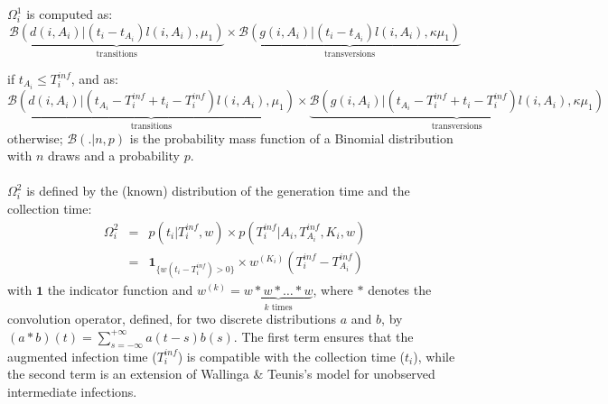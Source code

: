 \documentclass[10pt]{article}
\begin{document}
$\Omega_i^1$ is computed as: 
\begin{equation}
\underbrace{\mathcal{B}\left(d(i,A_i) | (t_i - t_{A_i}) l(i,A_i), \mu_1 \right)}_{\mbox{transitions}}
\times 
\underbrace{\mathcal{B}\left(g(i,A_i) | (t_i - t_{A_i}) l(i,A_i), \kappa \mu_1 \right)}_{\mbox{transversions}}
\end{equation}

if $t_{A_i} \leq T_i^{inf} $, and as:
\begin{equation}
\underbrace{\mathcal{B}\left(d(i,A_i) | (t_{A_i} - T_i^{inf} + t_i - T_i^{inf}) l(i,A_i), \mu_1 \right)}_{\mbox{transitions}}
\times 
\underbrace{\mathcal{B}\left(g(i,A_i) | (t_{A_i} - T_i^{inf} + t_i - T_i^{inf}) l(i,A_i), \kappa \mu_1 \right)}_{\mbox{transversions}}
\end{equation}
otherwise; $\mathcal{B}(. | n, p)$ is the probability mass function of a Binomial distribution with $n$ draws and a probability $p$.
~\\

% 
~\\





$\Omega_i^2$ is defined by the (known) distribution of the generation time and the collection time:
\begin{eqnarray}
 \Omega_i^2 & = & p(t_i | T_i^{inf}, w) \times p(T_i^{inf} | A_i, T_{A_i}^{inf}, K_i, w) \nonumber \\
& = &  \mathbf{1}_{\{w(t_i - T_i^{inf}) > 0\}} \times  w^{\left(K_i\right)}(T_i^{inf} - T_{A_i}^{inf})
\end{eqnarray}
with $\mathbf{1}$ the indicator function and $w^{\left(k\right)} = \underbrace{w*w*\ldots*w}_{k \text{ times}} $, where $*$ denotes the convolution operator, defined, for two discrete distributions $a$ and $b$, by $\left(a*b\right)\left(t\right) = \sum_{s=-\infty}^{+\infty} a\left(t-s\right)b\left(s\right)$.
The first term ensures that the augmented infection time ($T_i^{inf}$) is compatible with the collection time ($t_i$), while the second term is an extension of Wallinga \& Teunis's model for unobserved intermediate infections.
\\
\end{document}
